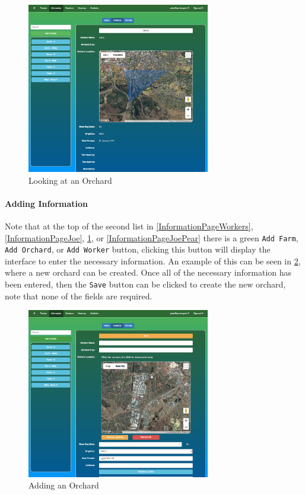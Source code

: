 \documentclass[11pt]{article}
\begin{document}
\begin{figure}
 \centering
 \includegraphics[width=8cm, keepaspectratio]{Images/UsingSystem/WebOrchard.png}
 \caption{Looking at an Orchard}
 \label{InformationPagePear}
\end{figure}

\paragraph{Adding Information}Note that at the top of the second list in \ref{InformationPageWorkers}, \ref{InformationPageJoe}, \ref{InformationPagePear}, or \ref{InformationPageJoePear} there is a green \texttt{Add Farm}, \texttt{Add Orchard}, or \texttt{Add Worker} button, clicking this button will display the interface to enter the necessary information. An example of this can be seen in \ref{InformationAddOrchard}, where a new orchard can be created. Once all of the necessary information has been entered, then the \texttt{Save} button can be clicked to create the new orchard, note that none of the fields are required.

\begin{figure}
 \centering
 \includegraphics[width=8cm, keepaspectratio]{Images/UsingSystem/WebOrchardAdd.png}
 \caption{Adding an Orchard}
 \label{InformationAddOrchard}
\end{figure}
\end{document}
